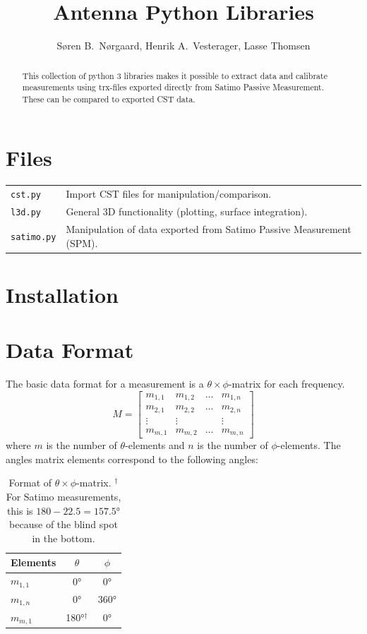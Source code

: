 \documentclass[10pt]{article}
\title{Antenna Python Libraries}
\author{Søren B.\ Nørgaard, Henrik A.\ Vesterager, Lasse Thomsen}
\begin{document}
\maketitle

\begin{abstract}
    This collection of python 3 libraries makes it possible to extract data and calibrate measurements using trx-files exported directly from Satimo Passive Measurement. These can be compared to exported CST data.
\end{abstract}

\tableofcontents


\section{Files}
\begin{tabularx}{\linewidth}{lX}
    \texttt{cst.py} & Import CST files for manipulation/comparison. \\
    \texttt{l3d.py} & General 3D functionality (plotting, surface integration). \\
    \texttt{satimo.py} & Manipulation of data exported from Satimo Passive Measurement (SPM). 
\end{tabularx}

\section{Installation}


\section{Data Format}
The basic data format for a measurement is a $\theta \times \phi$-matrix for each frequency.
\begin{equation}
    M = \begin{bmatrix}
        m_{1,1} & m_{1,2} & \dots & m_{1,n} \\
        m_{2,1} & m_{2,2} & \dots & m_{2,n} \\
        \vdots & \vdots & & \vdots \\
        m_{m,1} & m_{m,2} & \dots & m_{m,n}
    \end{bmatrix}
\end{equation}
where $m$ is the number of $\theta$-elements and $n$ is the number of $\phi$-elements. The angles matrix elements correspond to the following angles:
\begin{table}[htbp]
    \centering
    \begin{tabular}{|l|c|c|}
        \hline
        Elements & $\theta$ & $\phi$ \\
        \hline
        $m_{1,1}$ & \ang{0} & \ang{0} \\
        $m_{1,n}$ & \ang{0} & $\ang{360}$ \\
        $m_{m,1}$ & \ang{180}$^{\dagger}$ & \ang{0} \\
        \hline
    \end{tabular}
    \caption{Format of $\theta\times\phi$-matrix. $^{\dagger}$For Satimo measurements, this is $180-22.5=\ang{157.5}$ because of the blind spot in the bottom.}
    \label{tab:matrixformat}
\end{table}
\end{document}
